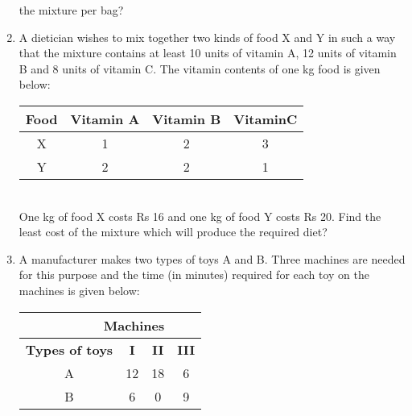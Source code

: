 \begin{enumerate}[label=\arabic*.,ref=\thesubsection.\theenumi]
the mixture per bag?\\
\item A dietician wishes to mix together two kinds of food X and Y in such a way that
the mixture contains at least 10 units of vitamin A, 12 units of vitamin B and
8 units of vitamin C. The vitamin contents of one kg food is given below:\\
\begin{tabular}{|c|c|c|c|}
\hline
\textbf{Food} &\textbf{Vitamin A} &\textbf{Vitamin B} & \textbf{VitaminC}\\
\hline
X & 1 & 2 & 3\\
\hline
Y &2 &2 &1\\
\hline


\end{tabular}\\
One kg of food X costs Rs 16 and one kg of food Y costs Rs 20. Find the least
cost of the mixture which will produce the required diet?\\
\item A manufacturer makes two types of toys A and B. Three machines are needed
for this purpose and the time (in minutes) required for each toy on the machines
is given below:\\
\begin{tabular}{|c|c|c|c|}
\hline
 \multicolumn{3}{|r}{\textbf{ Machines}}& \\ \cline{2-4}
\hline
\textbf {Types of toys}&\textbf{I}&\textbf{II}&\textbf{III}\\
\hline
A&12&18&6\\
\hline
 B&6&0&9\\
 \hline 

\end{tabular}




\end{enumerate}
